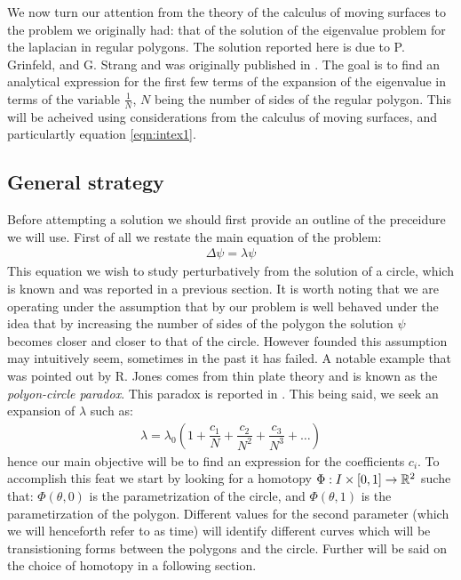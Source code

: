 \documentclass[../main.tex]{subfiles}
\begin{document}
		We now turn our attention from the theory of the calculus of moving surfaces to the problem we originally had: that of the solution of the eigenvalue problem for the laplacian in regular polygons. The solution reported here is due to P. Grinfeld, and G. Strang and was originally published in \cite{grinfeld2012laplace}. The goal is to find an analytical expression for the first few terms of the expansion of the eigenvalue in terms of the variable $ \frac{1}{N} $, $ N $ being the number of sides of the regular polygon. This will be acheived using considerations from the calculus of moving surfaces, and particulartly equation \ref{eqn:intex1}.
		\subsection{General strategy}
		Before attempting a solution we should first provide an outline of the preceidure we will use. First of all we restate the main equation of the problem:
		\begin{gather}
			\Delta\psi=\lambda\psi
		\end{gather}
		This equation we wish to study perturbatively from the solution of a circle, which is known and was reported in a previous section. It is worth noting that we are operating under the assumption that by our problem is well behaved under the idea that by increasing the number of sides of the polygon the solution $ \psi $ becomes closer and closer to that of the circle. However founded this assumption may intuitively seem, sometimes in the past it has failed. A notable example that was pointed out by R. Jones \cite{Jones2017} comes from thin plate theory and is known as the \emph{polyon-circle paradox}. This paradox is reported in \cite{murray1973polygon}. This being said, we seek an expansion of $ \lambda $ such as:
		\begin{gather}
			\lambda = \lambda_{0}\left(1+\dfrac{c_{1}}{N}+\dfrac{c_{2}}{N^{2}}+\dfrac{c_{3}}{N^{3}}+\dots\right)
		\end{gather}
		hence our main objective will be to find an expression for the coefficients $ c_{i} $. To accomplish this feat we start by looking for a homotopy $ \Phi:I\times\left[0,1\right]\to\mathbb{R}^{2} $ suche that: $ \Phi\left(\theta,0\right) $ is the parametrization of the circle, and $ \Phi\left(\theta,1\right) $ is the parametirzation of the polygon. Different values for the second parameter (which we will henceforth refer to as time) will identify different curves which will be transistioning forms between the polygons and the circle. Further will be said on the choice of homotopy in a following section.
		
\end{document}
